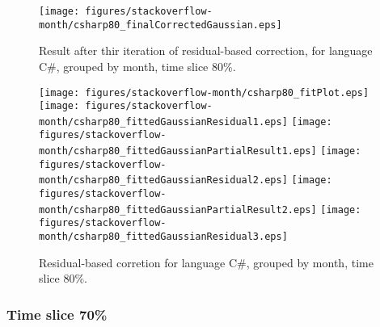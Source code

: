 \begin{figure}[]
\centering
{\texttt{[image: figures/stackoverflow-month/csharp80\_finalCorrectedGaussian.eps]}}
\caption{Result after thir iteration of residual-based correction, for language C\#, grouped by month, time slice 80\%.}
\end{figure}


\begin{figure}[hb]
\centering
{}
{\texttt{[image: figures/stackoverflow-month/csharp80\_fitPlot.eps]}}
{\texttt{[image: figures/stackoverflow-month/csharp80\_fittedGaussianResidual1.eps]}}
{\texttt{[image: figures/stackoverflow-month/csharp80\_fittedGaussianPartialResult1.eps]}}
{\texttt{[image: figures/stackoverflow-month/csharp80\_fittedGaussianResidual2.eps]}}
{\texttt{[image: figures/stackoverflow-month/csharp80\_fittedGaussianPartialResult2.eps]}}
{\texttt{[image: figures/stackoverflow-month/csharp80\_fittedGaussianResidual3.eps]}}
\caption{Residual-based corretion for language C\#, grouped by month, time slice 80\%.}
\end{figure}


\clearpage 
\newpage 


\FloatBarrier

\subsubsection{Time slice 70\%}

